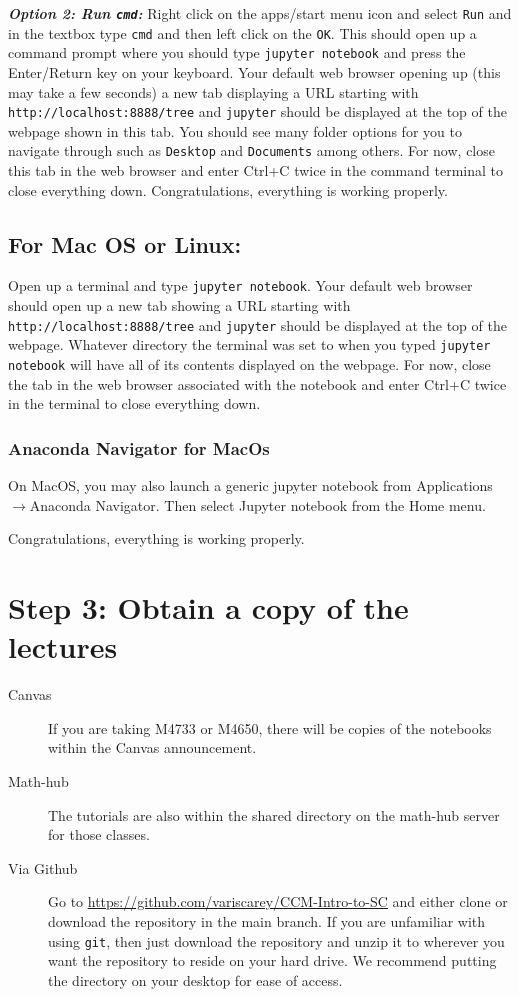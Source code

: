 \documentclass{amsart}
\theoremstyle{plain}
\theoremstyle{definition}
\theoremstyle{remark}
\theoremstyle{definition}
\numberwithin{equation}{section}
\numberwithin{equation}{section}
\begin{document}
{\bf \em Option 2: Run \verb|cmd|:}
Right click on the apps/start menu icon and select \verb|Run| and in the textbox type \verb|cmd| and then left click on the \verb|OK|. 
This should open up a command prompt where you should type \verb|jupyter notebook| and press the Enter/Return key on your keyboard. 
Your default web browser opening up (this may take a few seconds) a new tab displaying a URL starting with \verb|http://localhost:8888/tree| and \verb|jupyter| should be displayed at the top of the webpage shown in this tab. 
You should see many folder options for you to navigate through such as \verb|Desktop| and \verb|Documents| among others. 
For now, close this tab in the web browser and enter Ctrl+C twice in the command terminal to close everything down.
Congratulations, everything is working properly. 

\subsection*{For Mac OS or Linux:}

Open up a terminal and type \verb|jupyter notebook|. 
Your default web browser should open up a new tab showing a URL starting with \verb|http://localhost:8888/tree| and \verb|jupyter| should be displayed at the top of the webpage. 
Whatever directory the terminal was set to when you typed \verb|jupyter notebook| will have all of its contents displayed on the webpage. 
For now, close the tab in the web browser associated with the notebook and enter Ctrl+C twice in the terminal to close everything down.

\subsubsection*{Anaconda Navigator for MacOs}
On MacOS, you may also launch a generic jupyter notebook from Applications$\rightarrow$Anaconda Navigator.  Then select Jupyter notebook from the Home menu.

Congratulations, everything is working properly. 

\section*{Step 3: Obtain a copy of the lectures}

\begin{description} 
\item[Canvas] If you are taking M4733 or M4650, there will be copies of the notebooks within the Canvas announcement.
\item[Math-hub] The tutorials are also within the shared directory on the math-hub server for those classes.
\item[Via Github]
Go to \href{https://github.com/variscarey/CCM-Intro-to-SC}{https://github.com/variscarey/CCM-Intro-to-SC} and either clone or download the repository in the main branch.
If you are unfamiliar with using \verb|git|, then just download the repository and unzip it to wherever you want the repository to reside on your hard drive. 
We recommend putting the directory on your desktop for ease of access. 
\end{description}
\end{document}
